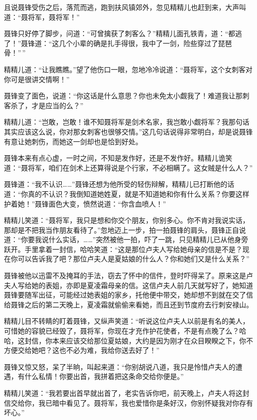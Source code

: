 \documentclass[12pt,oneside]{book}
\begin{document}
且说聂锋受伤之后，落荒而逃，跑到扶风镇郊外，忽见精精儿也赶到来，大声叫道：``聂将军，聂将军！''

聂锋只好停了脚步，问道：``可曾擒获了刺客么？''精精儿面孔铁青，道：``都逃了！''聂锋道：``这几个小辈的确是扎手得很，我中了一剑，险些穿过了琵琶骨！''\,''

精精儿道：``让我瞧瞧。''望了他伤口一眼，忽地冷冷说道：``聂将军，这个女刺客对你可是很讲交情啊！''

聂锋变了面色，说道：``你这话是什么意思？你也未免太小觑我了！难道我让那刺客杀了，才是应当的么？''

精精儿道：``岂敢，岂敢！谁不知聂将军是剑术名家，我岂敢小觑将军？我那句话其实应该这么说，你对那女刺客也很够交情。''这几句话说得非常明白，却是说聂锋有意让她刺伤，而她这一剑却也是恰到好处。

聂锋本来有点心虚，一时之间，不知是发作好，还是不发作好。精精儿诡笑道：``聂将军，咱们在剑术上还算得说是个行家，不必相瞒了。这女贼是什么人？''

聂锋道：``我不认识\ldots\ldots{}''聂锋还想为他所受的轻伤辩解，精精儿已打断他的话道：``你真的不认识？我倒知道她姓夏，就是不知道她和你有什么关系？你要这样护着她！''聂锋面色大变，愤然说道：``你含血喷人！''

精精儿笑道：``聂将军，我只是想和你交个朋友，你别多心。你不肯对我说实话，那却是不把我当作朋友看待了。''忽地迈上一步，拍一拍聂锋的肩头，聂锋正自说道：``你要我说什么实话，\ldots\ldots{}''突然被他一拍，吓了一跳，只见精精儿已从他身旁跃开。手里拿着一封信，哈哈笑道：``这是那位卢夫人写给她母亲的信是不是？现在你可以告诉我了吧？那位卢夫人是夏姑娘的什么人？你和她们又是什么关系？''

聂锋被他以迅雷不及掩耳的手法，窃去了怀中的信件，登时吓得呆了。原来这是卢夫人写给她的表姐，亦即是夏凌霜母亲的信。这信卢夫人前几天就写好了，她知道聂锋要随军出征，可能经过她表姐的家乡，托他便中带交，她却想不到就在交了信给聂锋之后的第二天晚上，夏凌霜就偷偷来看她，而且还到节度府去行刺安禄山。

精精儿目不转睛的盯着聂锋，又纵声笑道：``听说这位卢夫人以前是有名的美人，可惜她的容貌已经毁了，聂将军，你现在才充作护花使者，不是有点晚了么？哈哈，这封信，你本来应该交给那位夏姑娘，大约是因为刚才在众目睽睽之下，你不方便交给她吧？这也不必为难，我给你送去好了！''

聂锋又惊又怒，呆了半晌，叫起来道：``你别胡说八道，我只是怜惜卢夫人的遭遇，有什么私情！你要出首，我拼着把这条命交给你便是。''

精精儿笑道：``我若要出首早就出首了，老实告诉你吧，前天晚上，卢夫人将这封信交给你，我已暗中看见了。聂将军，我也爱惜你是条好汉，你别怀疑我对你存有坏心。''
\end{document}
